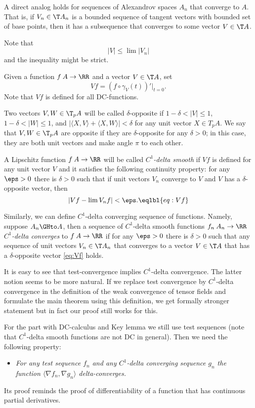 A direct analog holds for sequences of Alexandrov spaces $A_n$ that converge to $A$.
That is, if $V_n\in \T A_n$ is a bounded sequence of tangent vectors with bounded set of base points, then it has a subsequence that converges to some vector $V\in \T A$.

Note that 
\[|V|\le \lim |V_n|\]
and the inequality might be strict.




Given a function $f\:A\to \RR$ and a vector $V\in \T A$, set
\[Vf=(f\circ\gamma_V(t))'|_{t=0}.\]
Note that $Vf$ is defined for all DC-functions.

Two vectors $V,W\in \T_pA$ will be called $\delta$-opposite if
$1-\delta< |V|\le 1$,
$1-\delta< |W|\le 1$,
and $|\langle X,V\rangle +\langle X,W\rangle|<\delta$ for any unit vector $X\in T_p A$.
We say that $V,W\in \T_pA$ are opposite if they are $\delta$-opposite for any $\delta>0$;
in this case, they are both unit vectors and make angle $\pi$ to each other.  

A Lipschitz function $f\:A\to \RR$ will be called \emph{$C^1$-delta smooth} if $Vf$ is defined for any unit vector $V$ and it satisfies the following continuity property:
for any $\eps>0$ there is $\delta>0$ such that if unit vectors $V_n$ converge to $V$ and $V$ has a $\delta$-opposite vector, then 
\[|Vf-\lim V_nf|<\eps.\eqlbl{eq:Vf}\]

Similarly, we can define $C^1$-delta converging sequence of functions.
Namely, suppose $A_n\GHto A$, then a sequence of $C^1$-delta smooth functions $f_n\:A_n\to\RR$ \emph{$C^1$-delta converges} to $f\:A\to \RR$ if for any $\eps>0$ there is $\delta>0$ such that any sequence of unit vectors $V_n\in \T A_n$ that converges to a vector $V\in \T A$ that has a $\delta$-opposite vector \ref{eq:Vf} holds. 

It is easy to see that test-convergence implies $C^1$-delta convergence.
The latter notion seems to be more natural.
If we replace test convergence
by $C^1$-delta convergence
in the definition of the weak convergence of tensor fields and
formulate the main theorem using this definition, we get formally stronger
statement but in fact our proof 
still works for this.

For the part with DC-calculus and 
Key lemma we still use test sequences
(note that $C^1$-delta smooth functions are not DC in general).
Then we need the following property:
\begin{itemize}
 \item \textit{For any test sequence $f_n$ and any $C^1$-delta converging sequence $g_n$ the function
$\langle \nabla f_n , \nabla g_n
\rangle$ delta-converges.}
\end{itemize}
Its proof reminds the proof of differentiability of a function that has continuous partial derivatives. 
